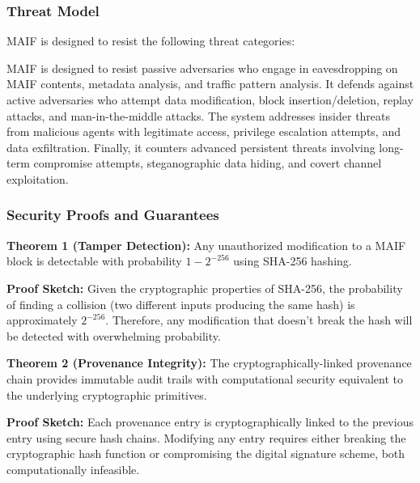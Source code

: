 \documentclass[conference]{IEEEtran}
\begin{document}
\subsubsection{Threat Model}

MAIF is designed to resist the following threat categories:

MAIF is designed to resist passive adversaries who engage in eavesdropping on MAIF contents, metadata analysis, and traffic pattern analysis. It defends against active adversaries who attempt data modification, block insertion/deletion, replay attacks, and man-in-the-middle attacks. The system addresses insider threats from malicious agents with legitimate access, privilege escalation attempts, and data exfiltration. Finally, it counters advanced persistent threats involving long-term compromise attempts, steganographic data hiding, and covert channel exploitation.

\subsubsection{Security Proofs and Guarantees}

\textbf{Theorem 1 (Tamper Detection):} Any unauthorized modification to a MAIF block is detectable with probability $1 - 2^{-256}$ using SHA-256 hashing.

\textbf{Proof Sketch:} Given the cryptographic properties of SHA-256, the probability of finding a collision (two different inputs producing the same hash) is approximately $2^{-256}$. Therefore, any modification that doesn't break the hash will be detected with overwhelming probability.

\textbf{Theorem 2 (Provenance Integrity):} The cryptographically-linked provenance chain provides immutable audit trails with computational security equivalent to the underlying cryptographic primitives.

\textbf{Proof Sketch:} Each provenance entry is cryptographically linked to the previous entry using secure hash chains. Modifying any entry requires either breaking the cryptographic hash function or compromising the digital signature scheme, both computationally infeasible.
\end{document}
